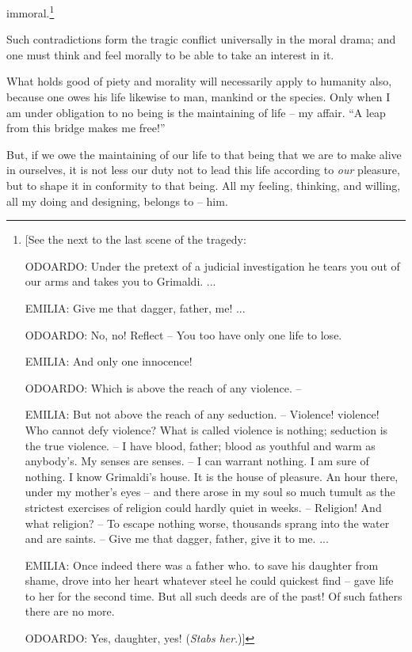 \documentclass[12pt,a4paper]{book}
\begin{document}
immoral.\footnote{[See the next to the last scene of the tragedy:

ODOARDO: Under the pretext of a judicial investigation he tears you out of our 
arms and takes you to Grimaldi. ...

EMILIA: Give me that dagger, father, me! ...

ODOARDO: No, no! Reflect -- You too have only one life to lose.

EMILIA: And only one innocence!

ODOARDO: Which is above the reach of any violence. --

EMILIA: But not above the reach of any seduction. -- Violence! violence! Who 
cannot defy violence? What is called violence is nothing; seduction is the 
true violence. -- I have blood, father; blood as youthful and warm as 
anybody's. My senses are senses. -- I can warrant nothing. I am sure of 
nothing. I know Grimaldi's house. It is the house of pleasure. An hour there, 
under my mother's eyes -- and there arose in my soul so much tumult as the 
strictest exercises of religion could hardly quiet in weeks. -- Religion! And 
what religion? -- To escape nothing worse, thousands sprang into the water and 
are saints. -- Give me that dagger, father, give it to me. ...

EMILIA: Once indeed there was a father who. to save his daughter from shame, 
drove into her heart whatever steel he could quickest find -- gave life to her 
for the second time. But all such deeds are of the past! Of such fathers there 
are no more.

ODOARDO: Yes, daughter, yes! (\textit{Stabs her}.)]

}

Such contradictions form the tragic conflict universally in the moral drama; 
and one must think and feel morally to be able to take an interest in it.

What holds good of piety and morality will necessarily apply to humanity also, 
because one owes his life likewise to man, mankind or the species. Only when I 
am under obligation to no being is the maintaining of life -- my affair. ``A 
leap from this bridge makes me free!''

But, if we owe the maintaining of our life to that being that we are to make 
alive in ourselves, it is not less our duty not to lead this life according to 
\textit{our} pleasure, but to shape it in conformity to that being. All my 
feeling, thinking, and willing, all my doing and designing, belongs to -- him.
\end{document}
